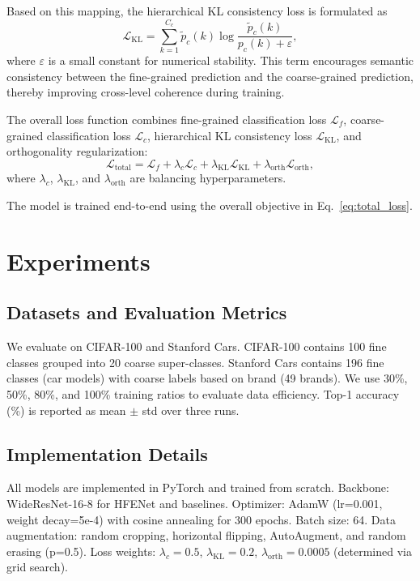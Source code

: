 \documentclass[pdflatex,sn-mathphys-num]{sn-jnl}
\theoremstyle{thmstyleone}%
\theoremstyle{thmstyletwo}%
\theoremstyle{thmstylethree}%
\begin{document}
Based on this mapping, the hierarchical KL consistency loss is formulated as
\begin{equation}
\mathcal{L}_{\mathrm{KL}} = \sum_{k=1}^{C_c} \tilde{p}_c(k)\log\frac{\tilde{p}_c(k)}{p_c(k)+\varepsilon},
\label{eq:kl_loss}
\end{equation}
where $\varepsilon$ is a small constant for numerical stability. 
This term encourages semantic consistency between the fine-grained prediction and the coarse-grained prediction, thereby improving cross-level coherence during training.

The overall loss function combines fine-grained classification loss $\mathcal{L}_f$, coarse-grained classification loss $\mathcal{L}_c$, hierarchical KL consistency loss $\mathcal{L}_{\mathrm{KL}}$, and orthogonality regularization:
\begin{equation}
\mathcal{L}_{\text{total}} = \mathcal{L}_f + \lambda_c \mathcal{L}_c + \lambda_{\mathrm{KL}} \mathcal{L}_{\mathrm{KL}} + \lambda_{\mathrm{orth}} \mathcal{L}_{\mathrm{orth}},
\label{eq:total_loss}
\end{equation}
where $\lambda_c$, $\lambda_{\mathrm{KL}}$, and $\lambda_{\mathrm{orth}}$ are balancing hyperparameters.

The model is trained end-to-end using the overall objective in Eq.~\eqref{eq:total_loss}.

\section{Experiments}
\label{sec:experiments}

\subsection{Datasets and Evaluation Metrics}
We evaluate on CIFAR-100 and Stanford Cars. CIFAR-100 contains 100 fine classes grouped into 20 coarse super-classes. Stanford Cars contains 196 fine classes (car models) with coarse labels based on brand (49 brands). We use 30\%, 50\%, 80\%, and 100\% training ratios to evaluate data efficiency. Top-1 accuracy (\%) is reported as mean $\pm$ std over three runs.

\subsection{Implementation Details}
All models are implemented in PyTorch and trained from scratch. Backbone: WideResNet-16-8 for HFENet and baselines. Optimizer: AdamW (lr=0.001, weight decay=5e-4) with cosine annealing for 300 epochs. Batch size: 64. Data augmentation: random cropping, horizontal flipping, AutoAugment, and random erasing (p=0.5). Loss weights: $\lambda_c=0.5$, $\lambda_{\mathrm{KL}}=0.2$, $\lambda_{\mathrm{orth}}=0.0005$ (determined via grid search).
\end{document}
